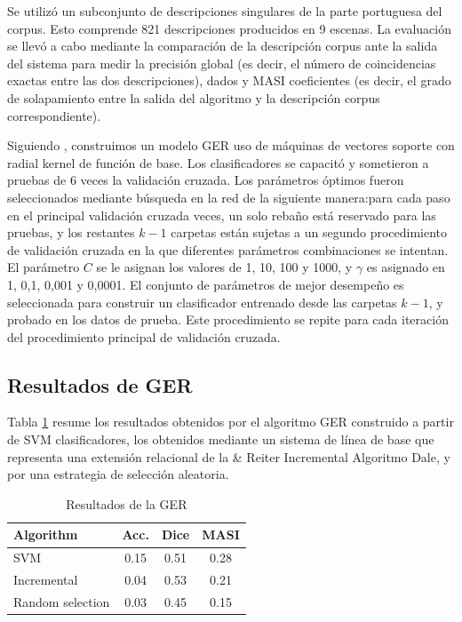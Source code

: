 Se utiliz\'o un subconjunto de descripciones singulares de la parte portuguesa del corpus. Esto comprende 821 descripciones producidos en 9 escenas. La evaluaci\'on se llev\'o a cabo mediante la comparaci\'on de la descripci\'on corpus ante la salida del sistema para medir la precisi\'on global (es decir, el n\'umero de coincidencias exactas entre las dos descripciones), dados \cite{dice} y MASI \cite{masi} coeficientes (es decir, el grado de solapamiento entre la salida del algoritmo y la descripci\'on corpus correspondiente).

Siguiendo \cite{thiago-svm}, construimos un modelo GER uso de m\'aquinas de vectores soporte con radial kernel de funci\'on de base. Los clasificadores se capacit\'o y sometieron a pruebas de 6 veces la validaci\'on cruzada. Los par\'ametros \'optimos fueron seleccionados mediante b\'usqueda en la red de la siguiente manera:para cada paso en el principal validaci\'on cruzada veces, un solo reba\~no est\'a reservado para las pruebas, y los restantes $k-1$ carpetas est\'an sujetas a un segundo procedimiento de validaci\'on cruzada en la que diferentes par\'ametros combinaciones se intentan. El par\'ametro $C$ se le asignan los valores de 1, 10, 100 y 1000, y $\gamma$ es asignado en 1, 0,1, 0,001 y 0,0001. El conjunto de par\'ametros de mejor desempe\~no es seleccionada para construir un clasificador entrenado desde las carpetas $k-1$, y probado en los datos de prueba. Este procedimiento se repite para cada iteraci\'on del procedimiento principal de validaci\'on cruzada.
\subsection{Resultados de GER }

Tabla \ref{tab-reg-results} resume los resultados obtenidos por el algoritmo GER construido a partir de SVM clasificadores, los obtenidos mediante un sistema de l\'{i}nea de base que representa una extensi\'on relacional de la \& Reiter Incremental Algoritmo Dale, y por una estrategia de selecci\'on aleatoria.

\begin{table}[ht]
\begin{center}
\caption{Resultados de la GER}
\label{tab-reg-results}
\begin{tabular} {  l c c c }
\hline
{Algorithm}							& {Acc.} 	& { Dice}		& MASI \\ \hline 
SVM											& 0.15		& 0.51			& 0.28 \\
Incremental							& 0.04		& 0.53			& 0.21 \\
Random selection       	& 0.03    & 0.45      & 0.15 \\
\hline
\end{tabular}
\end{center}
\end{table}

